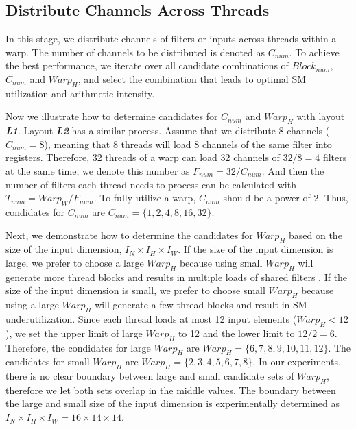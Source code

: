 \subsection{Distribute Channels Across Threads}
In this stage, we distribute channels of filters or inputs across threads within a warp.
The number of channels to be distributed is denoted as $C_{num}$.
To achieve the best performance, we iterate over all candidate combinations of $Block_{num}$, $C_{num}$ and $Warp_H$, and select the combination that leads to optimal SM utilization and arithmetic intensity.

Now we illustrate how to determine candidates for $C_{num}$ and $Warp_H$ with layout \textbf{\emph{L1}}. 
Layout \textbf{\emph{L2}} has a similar process.
Assume that we distribute 8 channels ($C_{num}=8$), meaning that 8 threads will load 8 channels of the same filter into registers. 
Therefore, 32 threads of a warp can load 32 channels of $32/8=4$ filters at the same time, we denote this number as $F_{num}=32/C_{num}$.
And then the number of filters each thread needs to process can be calculated with $T_{num}=Warp_W/F_{num}$.
To fully utilize a warp, $C_{num}$ should be a power of 2.
Thus, condidates for $C_{num}$ are $C_{num}=\{1,2,4,8,16,32\}$.

Next, we demonstrate how to determine the candidates for $Warp_H$ based on the size of the input dimension, $I_N \times I_H \times I_W$.
If the size of the input dimension is large, we prefer to choose a large $Warp_H$ because using small $Warp_H$ will generate more thread blocks and results in multiple loads of shared filters \cite{jia2020enabling, zheng2020flextensor}.
If the size of the input dimension is small, we prefer to choose small $Warp_H$ because using a large $Warp_H$ will generate a few thread blocks and result in SM underutilization.
Since each thread loads at most 12 input elements ($Warp_H<12$), we set the upper limit of large $Warp_H$ to 12 and the lower limit to $12/2=6$. 
Therefore, the condidates for large $Warp_H$ are $Warp_H=\{6,7,8,9,10,11,12\}$.
The candidates for small $Warp_H$ are $Warp_H=\{2,3,4,5,6,7,8\}$.
In our experiments, there is no clear boundary between large and small candidate sets of $Warp_H$, therefore we let both sets overlap in the middle values.
The boundary between the large and small size of the input dimension is experimentally determined as $I_N \times I_H \times I_W=16 \times 14 \times 14$.

